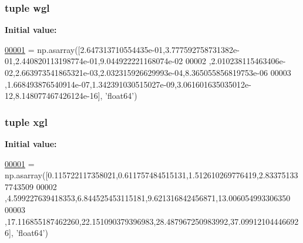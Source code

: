 \hypertarget{namespacepyneb_1_1utils_1_1__chianti__constants_a194c43506d8baeaec4a0a9bdefdc02d2}{
\subsubsection[{wgl}]{\setlength{\rightskip}{0pt plus 5cm}tuple wgl}}\label{namespacepyneb_1_1utils_1_1__chianti__constants_a194c43506d8baeaec4a0a9bdefdc02d2}
{\bfseries Initial value\-:}
\begin{DoxyCode}
\hypertarget{namespacepyneb_1_1utils_1_1__chianti__constants_l00001}{}\hyperlink{namespacepyneb_1_1utils_1_1__chianti__constants}{00001} = np.asarray([2.647313710554435e-01,3.777592758731382e-01,2.440820113198774e-01,9.044922221168074e-02
00002     ,2.010238115463406e-02,2.663973541865321e-03,2.032315926629993e-04,8.365055856819753e-06
00003     ,1.668493876540914e-07,1.342391030515027e-09,3.061601635035012e-12,8.148077467426124e-16], \textcolor{stringliteral}{'float64'})
\end{DoxyCode}
\hypertarget{namespacepyneb_1_1utils_1_1__chianti__constants_af3a02e5ae60445205fcd7a5a940fae65}{
\subsubsection[{xgl}]{\setlength{\rightskip}{0pt plus 5cm}tuple xgl}}\label{namespacepyneb_1_1utils_1_1__chianti__constants_af3a02e5ae60445205fcd7a5a940fae65}
{\bfseries Initial value\-:}
\begin{DoxyCode}
\hypertarget{namespacepyneb_1_1utils_1_1__chianti__constants_l00001}{}\hyperlink{namespacepyneb_1_1utils_1_1__chianti__constants}{00001} = np.asarray([0.115722117358021,0.611757484515131,1.512610269776419,2.833751337743509
00002     ,4.599227639418353,6.844525453115181,9.621316842456871,13.006054993306350
00003     ,17.116855187462260,22.151090379396983,28.487967250983992,37.099121044466926], \textcolor{stringliteral}{'float64'})
\end{DoxyCode}

